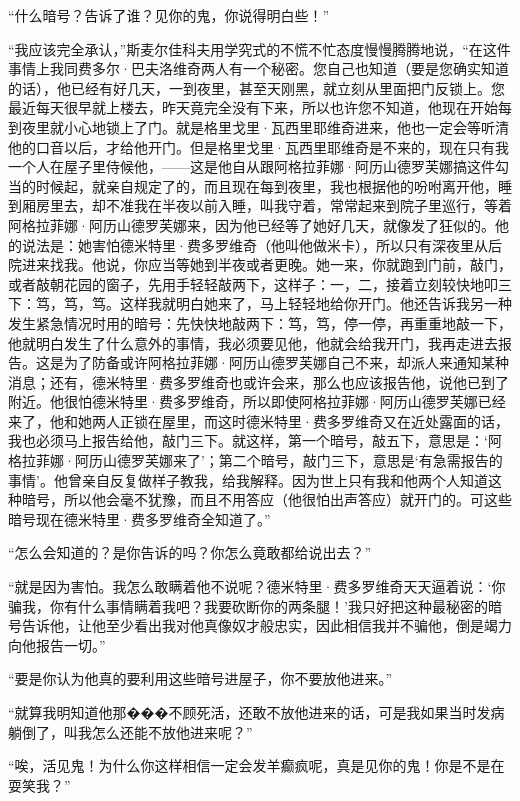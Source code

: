 \par “什么暗号？告诉了谁？见你的鬼，你说得明白些！”
\par “我应该完全承认，”斯麦尔佳科夫用学究式的不慌不忙态度慢慢腾腾地说，“在这件事情上我同费多尔·巴夫洛维奇两人有一个秘密。您自己也知道（要是您确实知道的话），他已经有好几天，一到夜里，甚至天刚黑，就立刻从里面把门反锁上。您最近每天很早就上楼去，昨天竟完全没有下来，所以也许您不知道，他现在开始每到夜里就小心地锁上了门。就是格里戈里·瓦西里耶维奇进来，他也一定会等听清他的口音以后，才给他开门。但是格里戈里·瓦西里耶维奇是不来的，现在只有我一个人在屋子里侍候他，——这是他自从跟阿格拉菲娜·阿历山德罗芙娜搞这件勾当的时候起，就亲自规定了的，而且现在每到夜里，我也根据他的吩咐离开他，睡到厢房里去，却不准我在半夜以前入睡，叫我守着，常常起来到院子里巡行，等着阿格拉菲娜·阿历山德罗芙娜来，因为他已经等了她好几天，就像发了狂似的。他的说法是：她害怕德米特里·费多罗维奇（他叫他做米卡），所以只有深夜里从后院进来找我。他说，你应当等她到半夜或者更晚。她一来，你就跑到门前，敲门，或者敲朝花园的窗子，先用手轻轻敲两下，这样子：一，二，接着立刻较快地叩三下：笃，笃，笃。这样我就明白她来了，马上轻轻地给你开门。他还告诉我另一种发生紧急情况时用的暗号：先快快地敲两下：笃，笃，停一停，再重重地敲一下，他就明白发生了什么意外的事情，我必须要见他，他就会给我开门，我再走进去报告。这是为了防备或许阿格拉菲娜·阿历山德罗芙娜自己不来，却派人来通知某种消息；还有，德米特里·费多罗维奇也或许会来，那么也应该报告他，说他已到了附近。他很怕德米特里·费多罗维奇，所以即使阿格拉菲娜·阿历山德罗芙娜已经来了，他和她两人正锁在屋里，而这时德米特里·费多罗维奇又在近处露面的话，我也必须马上报告给他，敲门三下。就这样，第一个暗号，敲五下，意思是：‘阿格拉菲娜·阿历山德罗芙娜来了’；第二个暗号，敲门三下，意思是‘有急需报告的事情’。他曾亲自反复做样子教我，给我解释。因为世上只有我和他两个人知道这种暗号，所以他会毫不犹豫，而且不用答应（他很怕出声答应）就开门的。可这些暗号现在德米特里·费多罗维奇全知道了。”
\par “怎么会知道的？是你告诉的吗？你怎么竟敢都给说出去？”
\par “就是因为害怕。我怎么敢瞒着他不说呢？德米特里·费多罗维奇天天逼着说：‘你骗我，你有什么事情瞒着我吧？我要砍断你的两条腿！’我只好把这种最秘密的暗号告诉他，让他至少看出我对他真像奴才般忠实，因此相信我并不骗他，倒是竭力向他报告一切。”
\par “要是你认为他真的要利用这些暗号进屋子，你不要放他进来。”
\par “就算我明知道他那���不顾死活，还敢不放他进来的话，可是我如果当时发病躺倒了，叫我怎么还能不放他进来呢？”
\par “唉，活见鬼！为什么你这样相信一定会发羊癫疯呢，真是见你的鬼！你是不是在耍笑我？”
